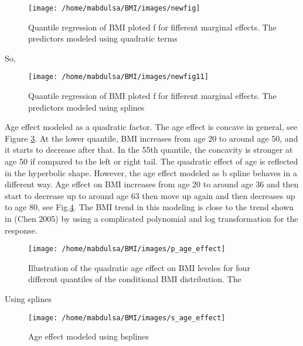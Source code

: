 \documentclass[
  12pt,
]{article}
\begin{document}
\begin{figure}

{\centering \texttt{[image: /home/mabdulsa/BMI/images/newfig]} 

}

\caption{Quantile regression of BMI ploted f for fifferent marginal effects. The predictors modeled using quadratic terms }\label{fig:resu1}
\end{figure}

So,

\begin{figure}

{\centering \texttt{[image: /home/mabdulsa/BMI/images/newfig11]} 

}

\caption{Quantile regression of BMI ploted f for fifferent marginal effects. The predictors modeled using splines }\label{fig:resu12}
\end{figure}

Age effect modeled as a quadratic factor. The age effect is concave in general, see Figure \ref{fig:resu3}. At the lower quantile, BMI increases from age 20 to around age 50, and it starts to decrease after that. In the 55th quantile, the concavity is stronger at age 50 if compared to the left or right tail. The quadratic effect of age is reflected in the hyperbolic shape. However, the age effect modeled as b spline behaves in a different way. Age effect on BMI increases from age 20 to around age 36 and then start to decrease up to around age 63 then move up again and then decreases up to age 80, see Fig.\ref{fig:resu33}. The BMI trend in this modeling is close to the trend shown in (Chen 2005) by using a complicated polynomial and log transformation for the response.

\begin{figure}

{\centering \texttt{[image: /home/mabdulsa/BMI/images/p\_age\_effect]} 

}

\caption{Illustration of the quadratic age effect on BMI leveles for four different quantiles of the conditional BMI distribution.  The }\label{fig:resu3}
\end{figure}

Using splines

\begin{figure}

{\centering \texttt{[image: /home/mabdulsa/BMI/images/s\_age\_effect]} 

}

\caption{Age effect modeled using bsplines }\label{fig:resu33}
\end{figure}
\end{document}
